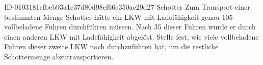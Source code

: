 \begin{exercise}
      {ID-0103181cfbeb93a1e37d80d98ef66c350ac29d27}
      {Schotter}
  \ifproblem\problem
    Zum Transport einer bestimmten Menge Schotter hätte ein LKW
    mit  Ladefähigkeit genau 105 vollbeladene Fuhren
    durchführen müssen. Nach 35 dieser Fuhren wurde er durch
    einen anderen LKW mit  Ladefähigkeit abgelöst.
    Stelle fest, wie viele vollbeladene Fuhren dieser zweite
    LKW noch durchzuführen hat, um die restliche Schottermenge
    abzutransportieren.
  \fi
\end{exercise}
